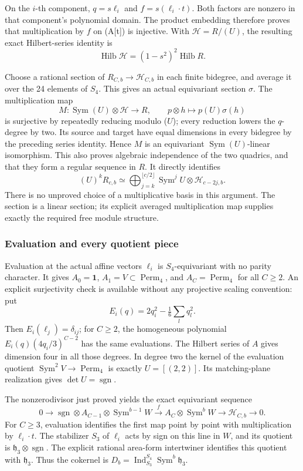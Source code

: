 \documentclass[
  10pt,
]{article}
\begin{document}
On the \(i\)-th component, \(q=s\ell_i\) and \(f=s(\ell_i\cdot t)\).
Both factors are nonzero in that component's polynomial domain. The
product embedding therefore proves that multiplication by \(f\) on
(A{[}t{]}) is injective. With \(\mathcal H=R/(U)\), the resulting exact
Hilbert-series identity is \[
\operatorname{Hilb}\mathcal H=(1-s^2)^2\operatorname{Hilb}R.
\]

Choose a rational section of \(R_{C,b}\to\mathcal H_{C,b}\) in each
finite bidegree, and average it over the 24 elements of \(S_4\). This
gives an actual equivariant section \(\sigma\). The multiplication map
\[
M:\operatorname{Sym}(U)\otimes\mathcal H\longrightarrow R,
\qquad p\otimes h\longmapsto p(U)\sigma(h)
\] is surjective by repeatedly reducing modulo (\(U\)); every reduction
lowers the \(q\)-degree by two. Its source and target have equal
dimensions in every bidegree by the preceding series identity. Hence
\(M\) is an equivariant \(\operatorname{Sym}(U)\)-linear isomorphism.
This also proves algebraic independence of the two quadrics, and that
they form a regular sequence in \(R\). It directly identifies \[
(U)^kR_{c,b}
\simeq\bigoplus_{j=k}^{\lfloor c/2\rfloor}
\operatorname{Sym}^jU\otimes\mathcal H_{c-2j,b}.
\] There is no unproved choice of a multiplicative basis in this
argument. The section is a linear section; its explicit averaged
multiplication map supplies exactly the required free module structure.

\subsubsection{Evaluation and every quotient
piece}\label{evaluation-and-every-quotient-piece}

Evaluation at the actual affine vectors \(\ell_i\) is
\(S_4\)-equivariant with no parity character. It gives \(A_0=\mathbf1\),
\(A_1=V\subset\operatorname{Perm}_4\), and \(A_C=\operatorname{Perm}_4\)
for all \(C\ge2\). An explicit surjectivity check is available without
any projective scaling convention: put \[
E_i(q)=2q_i^2-\tfrac16\sum_lq_l^2.
\] Then \(E_i(\ell_j)=\delta_{ij}\); for \(C\ge2\), the homogeneous
polynomial \(E_i(q)(4q_i/3)^{C-2}\) has the same evaluations. The
Hilbert series of \(A\) gives dimension four in all those degrees. In
degree two the kernel of the evaluation quotient
\(\operatorname{Sym}^2V\to\operatorname{Perm}_4\) is exactly
\(U=[(2,2)]\). Its matching-plane realization gives
\(\det U=\operatorname{sgn}\).

The nonzerodivisor just proved yields the exact equivariant sequence \[
0\longrightarrow\operatorname{sgn}\otimes A_{C-1}\otimes\operatorname{Sym}^{b-1}W
\xrightarrow{f}A_C\otimes\operatorname{Sym}^bW
\longrightarrow\mathcal H_{C,b}\longrightarrow0.
\] For \(C\ge3\), evaluation identifies the first map point by point
with multiplication by \(\ell_i\cdot t\). The stabilizer \(S_3\) of
\(\ell_i\) acts by sign on this line in \(W\), and its quotient is
\(\mathfrak h_3\otimes\operatorname{sgn}\). The explicit rational
area-form intertwiner identifies this quotient with \(\mathfrak h_3\).
Thus the cokernel is
\(D_b=\operatorname{Ind}_{S_3}^{S_4}\operatorname{Sym}^b\mathfrak h_3\).
\end{document}

